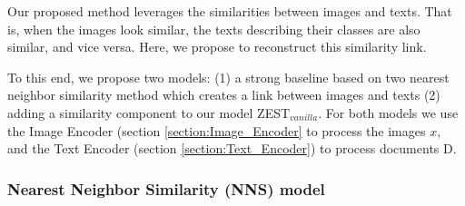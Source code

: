\documentclass[11pt,a4paper]{article}
\newcommand\gal[1]{\textcolor{bright}{\textbf{GAL:} #1 }}
\newcommand\yuval[1]{\textcolor{darkpink}{\textbf{YUVAL:} #1 }}
\begin{document}
Our proposed method leverages the similarities between images and texts. That is, when the  images look similar, the texts describing their classes are also similar, and vice versa. Here, we propose
to reconstruct this similarity  link. 






 To this end, we propose two models: (1) a strong baseline based on two nearest neighbor similarity method  which creates a link between images and texts (2) adding a similarity component to our model ZEST$_{vanilla}$.
For both models we use the Image Encoder (section \ref{section:Image_Encoder} to process the images $x$, and the Text Encoder (section \ref{section:Text_Encoder}) to process documents D.




%
%






\subsubsection{Nearest Neighbor Similarity (NNS) model}
\end{document}
